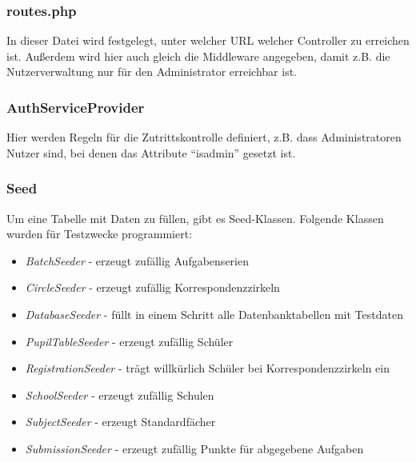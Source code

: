 \subsubsection{routes.php}

In dieser Datei wird festgelegt, unter welcher URL welcher Controller zu erreichen ist. Außerdem wird hier auch gleich die Middleware angegeben, damit z.B. die Nutzerverwaltung nur für den Administrator erreichbar ist.

\subsubsection{AuthServiceProvider}

Hier werden Regeln für die Zutrittskontrolle definiert, z.B. dass Administratoren Nutzer sind, bei denen das Attribute "`isadmin"' gesetzt ist.

\subsubsection{Seed}

Um eine Tabelle mit Daten zu füllen, gibt es Seed-Klassen. Folgende Klassen wurden für Testzwecke programmiert:

\begin{itemize}
	\item \textit{BatchSeeder} - erzeugt zufällig Aufgabenserien
	\item \textit{CircleSeeder} - erzeugt zufällig Korrespondenzzirkeln
	\item \textit{DatabaseSeeder} - füllt in einem Schritt alle Datenbanktabellen mit Testdaten
	\item \textit{PupilTableSeeder} - erzeugt zufällig Schüler
	\item \textit{RegistrationSeeder} - trägt willkürlich Schüler bei Korrespondenzzirkeln ein
	\item \textit{SchoolSeeder} - erzeugt zufällig Schulen
	\item \textit{SubjectSeeder} - erzeugt Standardfächer
	\item \textit{SubmissionSeeder} - erzeugt zufällig Punkte für abgegebene Aufgaben
\end{itemize}
